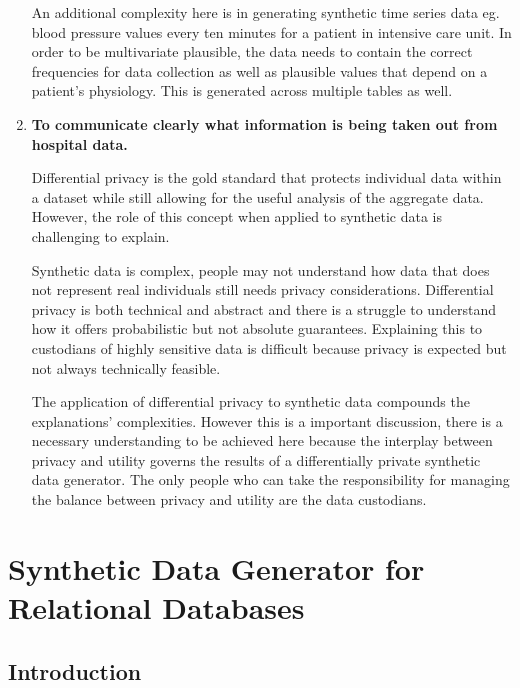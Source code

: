 \documentclass[11pt]{article}
\begin{document}
\begin{enumerate}[leftmargin=*]
    An additional complexity here is in generating synthetic time series data eg. blood pressure values every ten minutes for a patient in intensive care unit. In order to be multivariate plausible, the data needs to contain the correct frequencies for data collection as well as plausible values that depend on a patient's physiology. This is generated across multiple tables as well.  

    \item \textbf{To communicate clearly what information is being taken out from hospital data.
    }
    
    Differential privacy is the gold standard that protects individual data within a dataset while still allowing for the useful analysis of the aggregate data. However, the role of this concept when applied to synthetic data is challenging to explain. 
    
    Synthetic data is complex, people may not understand how data that does not represent real individuals still needs privacy considerations. Differential privacy is both technical and abstract and there is a struggle to understand how it offers probabilistic but not absolute guarantees. Explaining this to custodians of highly sensitive data is difficult because privacy is expected but not always technically feasible.
    
    The application of differential privacy to synthetic data compounds the explanations' complexities. However this is a important discussion, there is a necessary understanding to be achieved here because the interplay between privacy and utility governs the results of a differentially private synthetic data generator. The only people who can take the responsibility for managing the balance between privacy and utility are the data custodians.
\end{enumerate}

\section{Synthetic Data Generator for Relational Databases}

\subsection{Introduction}
\end{document}
